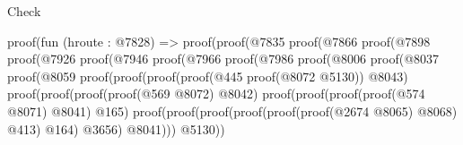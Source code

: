 \begin{lexlean}{Check}
\begin{coremodule}
                              proof(fun (hroute : @7828) =>
                                proof(proof(@7835
                                      proof(@7866
                                          proof(@7898
                                              proof(@7926
                                                  proof(@7946
                                                      proof(@7966
                                                          proof(@7986
                                                              proof(@8006
                                                                  proof(@8037
                                                                      proof(@8059
                                                                          proof(proof(proof(proof(@445
                                                                                    proof(@8072
                                                                                        @5130))
                                                                                  @8043)
                                                                                proof(proof(proof(proof(@569
                                                                                          @8072)
                                                                                        @8042)
                                                                                      proof(proof(proof(proof(@574
                                                                                                @8071)
                                                                                              @8041)
                                                                                            @165)
                                                                                          proof(proof(proof(proof(proof(proof(@2674
                                                                                                        @8065)
                                                                                                      @8068)
                                                                                                    @413)
                                                                                                  @164)
                                                                                                @3656)
                                                                                              @8041)))
                                                                                    @5130))

\end{coremodule}
\end{lexlean}
